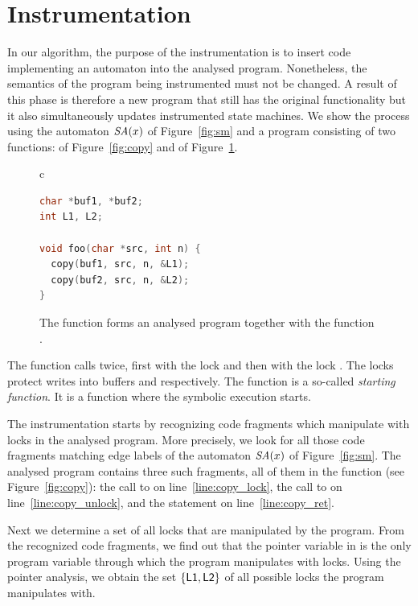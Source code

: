 \section{Instrumentation} \label{sec:fmics_instr}

In our algorithm, the purpose of the instrumentation is to insert code
implementing an automaton into the analysed program. Nonetheless, the
semantics of the program being instrumented must not be changed. A result of
this phase is therefore a new program that still has the original
functionality but it also simultaneously updates instrumented state machines.
We show the process using the automaton ${\textit{SA}}(x)$ of Figure~\ref{fig:sm} and a
program consisting of two functions:  of Figure~\ref{fig:copy} and
 of Figure~\ref{fig:fmics_foo}.
\begin{figure}[htb]
  \begin{center}
  \begin{tabular}{c}
    \begin{lstlisting}[language=C]
char *buf1, *buf2;
int L1, L2;

void foo(char *src, int n) {
  copy(buf1, src, n, &L1);
  copy(buf2, src, n, &L2);
}
    \end{lstlisting}
  \end{tabular}
  \end{center}
  \caption{The function  forms an analysed program together
    with the function .}
  \label{fig:fmics_foo}
\end{figure}
The function  calls  twice, first with the lock 
and then with the lock . The locks protect writes into buffers
 and  respectively.  The function  is a
so-called \emph{starting function}. It is a function where the symbolic
execution starts.

The instrumentation starts by recognizing code fragments which manipulate with
locks in the analysed program. More precisely, we look for all those code
fragments matching edge labels of the automaton ${\textit{SA}}(x)$ of
Figure~\ref{fig:sm}. The analysed program contains three such fragments, all
of them in the function  (see Figure~\ref{fig:copy}): the call to
 on line~\ref{line:copy_lock}, the call to  on
line~\ref{line:copy_unlock}, and the  statement on
line~\ref{line:copy_ret}.

Next we determine a set of all locks that are manipulated by the program.
From the recognized code fragments, we find out that the pointer variable
 in  is the only program variable through which the
program manipulates with locks.  Using the pointer analysis, we obtain the set
$\{ \mathsf{L1}, \mathsf{L2} \}$ of all possible locks the program manipulates with.

